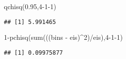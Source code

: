 \documentclass[
]{book}
\newenvironment{Shaded}{\begin{snugshade}}{\end{snugshade}}
\newcommand{\DecValTok}[1]{\textcolor[rgb]{0.00,0.00,0.81}{#1}}
\newcommand{\FloatTok}[1]{\textcolor[rgb]{0.00,0.00,0.81}{#1}}
\newcommand{\FunctionTok}[1]{\textcolor[rgb]{0.00,0.00,0.00}{#1}}
\newcommand{\NormalTok}[1]{#1}
\newcommand{\SpecialCharTok}[1]{\textcolor[rgb]{0.00,0.00,0.00}{#1}}
\begin{document}
\begin{Shaded}
\begin{Highlighting}[]
\FunctionTok{qchisq}\NormalTok{(}\FloatTok{0.95}\NormalTok{,}\DecValTok{4{-}1{-}1}\NormalTok{)}
\end{Highlighting}
\end{Shaded}

\begin{verbatim}
## [1] 5.991465
\end{verbatim}

\begin{Shaded}
\begin{Highlighting}[]
\DecValTok{1}\SpecialCharTok{{-}}\FunctionTok{pchisq}\NormalTok{(}\FunctionTok{sum}\NormalTok{(((bins }\SpecialCharTok{{-}}\NormalTok{ eis)}\SpecialCharTok{\^{}}\DecValTok{2}\NormalTok{)}\SpecialCharTok{/}\NormalTok{eis),}\DecValTok{4{-}1{-}1}\NormalTok{)}
\end{Highlighting}
\end{Shaded}

\begin{verbatim}
## [1] 0.09975877
\end{verbatim}

  
\end{document}

